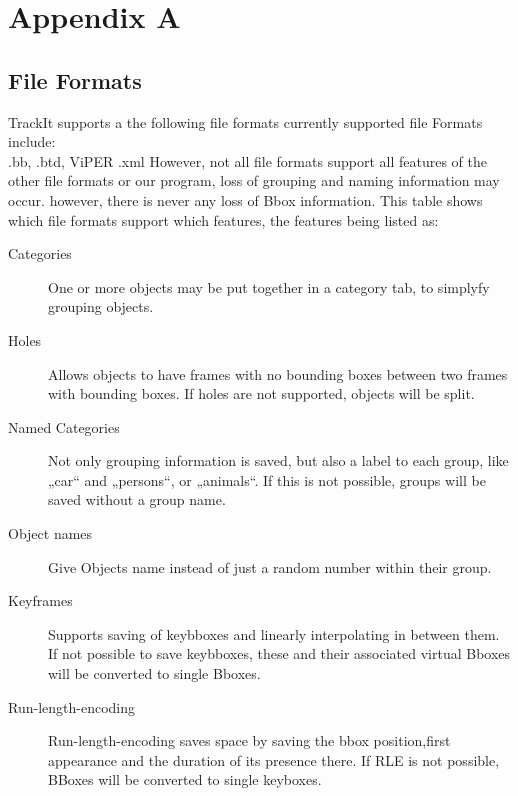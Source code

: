 \section{Appendix A}
   \subsection{File Formats}
      \label{fileformats}
      TrackIt supports a the following file formats currently supported file Formats include:\\
      .bb, .btd, ViPER .xml  
      However, not all file formats support all features of the other file formats or our program, loss of grouping and naming information may occur. however, there is never any loss of Bbox information.
      This table shows which file formats support which features, the features being listed as:
      \begin{description}
         \item[Categories]One or more objects may be put together in a category tab, to simplyfy grouping objects.
         \item[Holes] Allows objects to have frames with no bounding boxes between two frames with bounding boxes. If holes are not supported, objects will be split.
         \item[Named Categories]Not only grouping information is saved, but also a label to each group, like „car“ and „persons“, or „animals“. If this is not possible, groups will be saved without a group name.
         \item[Object names] Give Objects name instead of just a random number within their group.
         \item[Keyframes] Supports saving of keybboxes and linearly interpolating in between them. If not possible to save keybboxes, these and their associated virtual Bboxes will be converted to single Bboxes.
         \item[Run-length-encoding] Run-length-encoding saves space by saving the bbox position,first appearance and the duration of its presence there. If RLE is not possible, BBoxes will be converted to single keyboxes.
      \end{description} 

